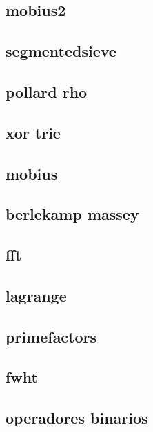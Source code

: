 \subsection{mobius2}
\raggedbottom
\hrulefill
\subsection{segmentedsieve}
\raggedbottom
\hrulefill
\subsection{pollard rho}
\raggedbottom
\hrulefill
\subsection{xor trie}
\raggedbottom
\hrulefill
\subsection{mobius}
\raggedbottom
\hrulefill
\subsection{berlekamp massey}
\raggedbottom
\hrulefill
\subsection{fft}
\raggedbottom
\hrulefill
\subsection{lagrange}
\raggedbottom
\hrulefill
\subsection{primefactors}
\raggedbottom
\hrulefill
\subsection{fwht}
\raggedbottom
\hrulefill
\subsection{operadores binarios}
\raggedbottom
\hrulefill
